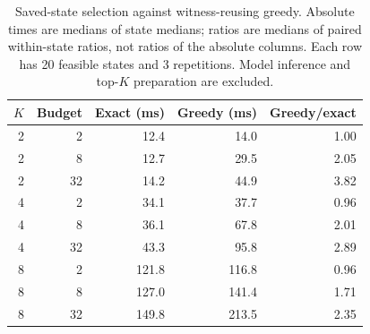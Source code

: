 \begin{table}[ht]
\centering\small
\caption{Saved-state selection against witness-reusing greedy. Absolute times are medians of state medians; ratios are medians of paired within-state ratios, not ratios of the absolute columns. Each row has 20 feasible states and 3 repetitions. Model inference and top-$K$ preparation are excluded.}
\label{tab:selection-audit}
\begin{tabular}{rrrrr}\toprule
$K$ & Budget & Exact (ms) & Greedy (ms) & Greedy/exact\\ \midrule
2 & 2 & 12.4 & 14.0 & 1.00 \\
2 & 8 & 12.7 & 29.5 & 2.05 \\
2 & 32 & 14.2 & 44.9 & 3.82 \\
4 & 2 & 34.1 & 37.7 & 0.96 \\
4 & 8 & 36.1 & 67.8 & 2.01 \\
4 & 32 & 43.3 & 95.8 & 2.89 \\
8 & 2 & 121.8 & 116.8 & 0.96 \\
8 & 8 & 127.0 & 141.4 & 1.71 \\
8 & 32 & 149.8 & 213.5 & 2.35 \\
\bottomrule\end{tabular}
\end{table}
